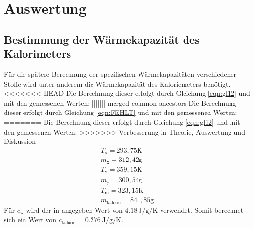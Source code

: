 \section{Auswertung}
\label{sec:Auswertung}

\subsection{Bestimmung der Wärmekapazität des Kalorimeters}
\label{sec:Kalorie}
Für die spätere Berechnung der spezifischen Wärmekapazitäten verschiedener Stoffe wird unter anderem die Wärmekapazität des Kaloriemeters benötigt.
<<<<<<< HEAD
Die Berechnung dieser erfolgt durch Gleichung \ref{eqn:gl12} und mit den gemessenen Werten:
||||||| merged common ancestors
Die Berechnung dieser erfolgt durch Gleichung \ref{eqn:FEHLT} und mit den gemessenen Werten:
=======
Die Berechnung dieser erfolgt durch Gleichung \eqref{eqn:gl12} und mit den gemessenen Werten:
>>>>>>> Verbesserung in Theorie, Auswertung und Diskussion
\begin{align*}
 T_\text{x} = 293,75 \text{K}\\
 m_\text{x} = 312,42 \text{g}\\
 T_\text{y} = 359,15 \text{K}\\
 m_\text{y} = 300,54 \text{g}\\
 T_\text{m} = 323,15 \text{K}\\
 m_\text{kalorie} = 841,85 \text{g}
\end{align*}
Für $c_\text{w}$ wird der in \cite{V201} angegeben Wert von $\SI{4,18}{\joule\per\gram\per\kelvin}$ verwendet.
Somit berechnet sich ein Wert von $ c_\text{kalorie} = \SI{0,276}{\joule\per\gram\per\kelvin}.$

